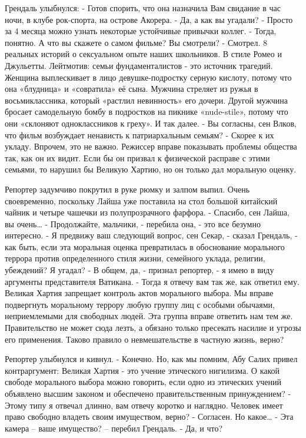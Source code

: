 \documentclass{book}
\begin{document}
Грендаль улыбнулся:
- Готов спорить, что она назначила Вам свидание в час ночи, в клубе рок-спорта, на острове Акорера.
- Да, а как вы угадали?
- Просто за 4 месяца можно узнать некоторые устойчивые привычки коллег.
- Тогда, понятно. А что вы скажете о самом фильме? Вы смотрели?
- Смотрел. 8 реальных историй о сексуальном опыте наших школьников. В стиле Ромео и Джульетты. Лейтмотив: семьи фундаменталистов - это источник трагедий. Женщина выплескивает в лицо девушке-подростку серную кислоту, потому что она «блудница» и «совратила» её сына. Мужчина стреляет из ружья в восьмиклассника, который «растлил невинность» его дочери. Другой мужчина бросает самодельную бомбу в подростков на пикнике «nude-stile», потому что они «склоняют одноклассников к греху». И так далее.
- Вы согласны, сен Влков, что фильм возбуждает ненависть к патриархальным семьям?
- Скорее к их укладу. Впрочем, это не важно. Режиссер вправе показывать проблемы общества так, как он их видит. Если бы он призвал к физической расправе с этими семьями, то нарушил бы Великую Хартию, но он только дал моральную оценку.

Репортер задумчиво покрутил в руке рюмку и залпом выпил. Очень своевременно, поскольку Лайша уже поставила на стол большой китайский чайник и четыре чашечки из полупрозрачного фарфора.
- Спасибо, сен Лайша, вы очень\ldots{}
- Продолжайте, мальчики, - перебила она, - это все безумно интересно.
- Я предвижу ваш следующий вопрос, сен Секар, - сказал Грендаль, - как быть, если эта моральная оценка превратилась в обоснование морального террора против определенного стиля жизни, семейного уклада, религии, убеждений? Я угадал?
- В общем, да, - признал репортер, - я имею в виду аргументы представителя Ватикана.
- Тогда я отвечу вам так же, как ответил ему. Великая Хартия запрещает контроль актов морального выбора. Мы вправе подвергнуть моральному террору любую группу лиц с особыми обычаями, неприемлемыми для свободных людей. Эта группа вправе ответить нам тем же. Правительство не может сюда лезть, а обязано только пресекать насилие и угрозы его применения. Таково правило о невмешательстве в частную жизнь, верно?

Репортер улыбнулся и кивнул.
- Конечно. Но, как мы помним, Абу Салих привел контраргумент: Великая Хартия - это учение этического нигилизма. О какой свободе морального выбора можно говорить, если одно из этических учений объявлено высшим законом и обеспечено правительственным принуждением?
- Этому типу я отвечал длинно, вам отвечу коротко и наглядно. Человек имеет право свободно владеть своим имуществом, верно?
- Согласен. Но какое\ldots{}
- Эта камера -- ваше имущество? -- перебил Грендаль.
- Да, и что?
\end{document}

